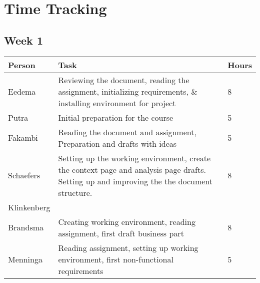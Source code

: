 \chapter{Time Tracking}
\label{App: Time Tracking}


\section{Week 1}
\begin{tabular}{L{0.2\textwidth} L{0.7\textwidth} L{0.1\textwidth}}
    \textbf{Person} & \textbf{Task} & \textbf{Hours} \\ \toprule
	Eedema & Reviewing the document, reading the assignment, initializing requirements, \& installing environment for project & 8 \\ \midrule
	Putra & Initial preparation for the course & 5 \\ \midrule
	Fakambi & Reading the document and assignment, Preparation and drafts with ideas & 5 \\ \midrule
	Schaefers & Setting up the working environment, create the context page and analysis page drafts. Setting up and improving the the document structure. & 8\\ \midrule
	Klinkenberg & & \\ \midrule
	Brandsma & Creating working environment, reading assignment, first draft business part & 8\\ \midrule
	Menninga & Reading assignment, setting up working environment, first non-functional requirements & 5 \\ \bottomrule
\end{tabular}

